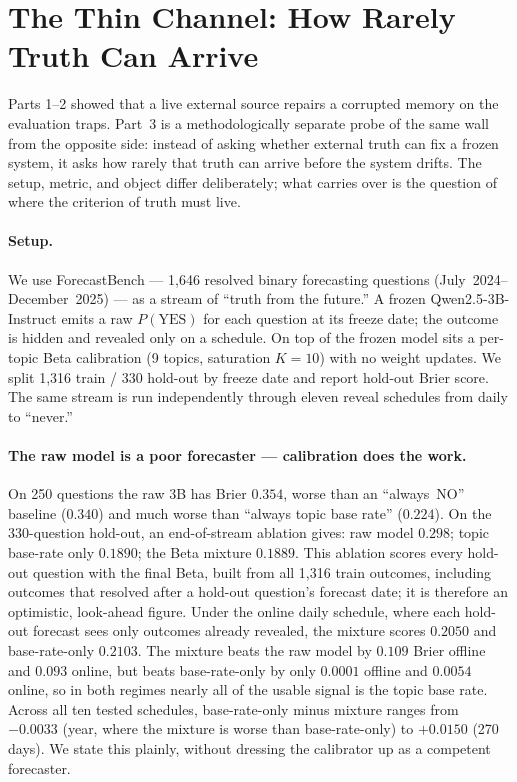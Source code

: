 \documentclass[11pt]{article}
\begin{document}
\section{The Thin Channel: How Rarely Truth Can Arrive}
\label{sec:thin}

Parts 1--2 showed that a live external source repairs a corrupted memory on the
evaluation traps.
Part~3 is a methodologically separate probe of the same wall from the opposite
side: instead of asking whether external truth can fix a frozen system, it asks
how rarely that truth can arrive before the system drifts. The setup, metric,
and object differ deliberately; what carries over is the question of where the
criterion of truth must live.

\paragraph{Setup.} We use ForecastBench --- 1{,}646 resolved binary forecasting
questions (July~2024--December~2025) --- as a stream of ``truth from the future.''
A frozen Qwen2.5-3B-Instruct emits a raw $P(\text{YES})$ for each question at its
freeze date; the outcome is hidden and revealed only on a schedule. On top of the
frozen model sits a per-topic Beta calibration (9 topics, saturation $K=10$) with
no weight updates. We split 1{,}316 train / 330 hold-out by freeze date and
report hold-out Brier score. The same stream is run independently through eleven
reveal schedules from daily to ``never.''

\paragraph{The raw model is a poor forecaster --- calibration does the work.}
On 250 questions the raw 3B has Brier $0.354$, worse than an ``always~NO''
baseline ($0.340$) and much worse than ``always topic base rate'' ($0.224$). On
the 330-question hold-out, an end-of-stream ablation gives: raw model $0.298$;
topic base-rate only $0.1890$; the Beta mixture $0.1889$. This ablation scores
every hold-out question with the final Beta, built from all 1{,}316 train
outcomes, including outcomes that resolved after a hold-out question's forecast
date; it is therefore an optimistic, look-ahead figure. Under the online daily
schedule, where each hold-out forecast sees only outcomes already revealed, the
mixture scores $0.2050$ and base-rate-only $0.2103$. The mixture beats the raw
model by $0.109$ Brier offline and $0.093$ online, but beats base-rate-only by
only $0.0001$ offline and $0.0054$ online, so in both regimes nearly all of the
usable signal is the topic base rate. Across all ten
tested schedules, base-rate-only minus mixture ranges from $-0.0033$ (year,
where the mixture is worse than base-rate-only) to $+0.0150$ (270 days). We state this plainly, without dressing the calibrator up as a
competent forecaster.
\end{document}
